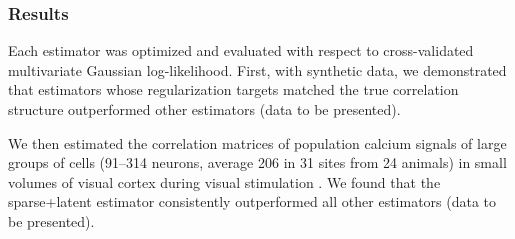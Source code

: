 \documentclass[12pt]{amsart}
\begin{document}
\subsubsection*{Results}
Each estimator was optimized and evaluated with respect to cross-validated multivariate Gaussian log-likelihood.  First, with synthetic data, we demonstrated that estimators whose regularization targets matched the true correlation structure outperformed other estimators (data to be presented).  

We then estimated the correlation matrices of population calcium signals of large groups of cells (91--314 neurons, average 206 in 31 sites from 24 animals) in small volumes of visual cortex during visual stimulation \cite{Cotton:2013}. We found that the sparse+latent estimator consistently outperformed all other estimators (data to be presented).
\end{document}
